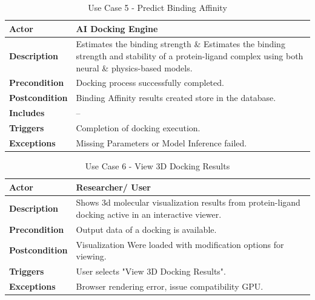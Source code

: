 \documentclass[12pt,a4]{report}
\begin{document}
\begin{itemize}
\begin{longtable}{|p{4cm}|p{9.8cm}|}
\caption{Use Case 5 - Predict Binding Affinity} \\ \hline
\textbf{Actor} & AI Docking Engine \\ \hline
\textbf{Description} & Estimates the binding strength \& Estimates the binding strength and stability of a protein-ligand complex using both neural \& physics-based models. \\ \hline
\textbf{Precondition} & Docking process successfully completed. \\ \hline
\textbf{Postcondition} & Binding Affinity results created store in the database. \\ \hline
\textbf{Includes} & -- \\ \hline
\textbf{Triggers} & Completion of docking execution. \\ \hline
\textbf{Exceptions} & Missing Parameters or Model Inference failed. \\ \hline
\end{longtable}

\begin{longtable}{|p{4cm}|p{9.8cm}|}
\caption{Use Case 6 - View 3D Docking Results} \\ \hline
\textbf{Actor} & Researcher/ User \\ \hline
\textbf{Description} & Shows 3d molecular visualization results from protein-ligand docking active in an interactive viewer. \\ \hline
\textbf{Precondition} & Output data of a docking is available. \\ \hline
\textbf{Postcondition} & Visualization Were loaded with modification options for viewing. \\ \hline
\textbf{Triggers} & User selects "View 3D Docking Results". \\ \hline
\textbf{Exceptions} & Browser rendering error, issue compatibility GPU. \\ \hline
\end{longtable}


\end{itemize}
\end{document}
